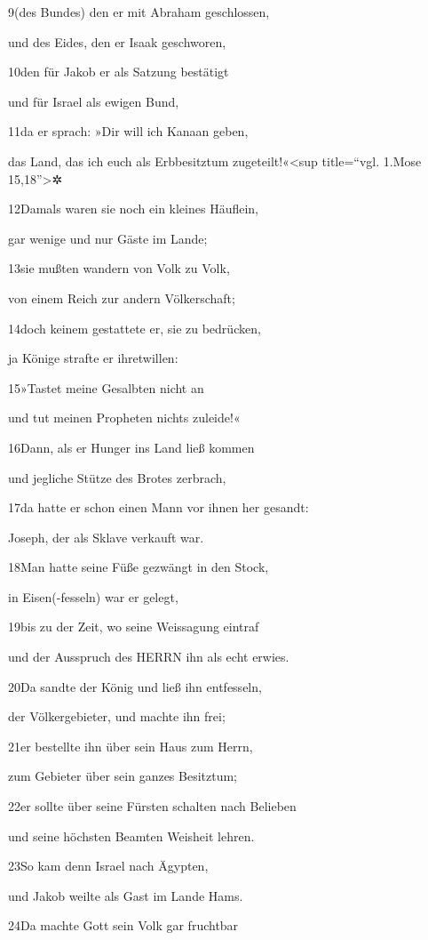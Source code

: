 9(des Bundes) den er mit Abraham geschlossen,

und des Eides, den er Isaak geschworen,

10den für Jakob er als Satzung bestätigt

und für Israel als ewigen Bund,

11da er sprach: »Dir will ich Kanaan geben,

das Land, das ich euch als Erbbesitztum zugeteilt!«\textless sup
title=``vgl. 1.Mose 15,18''\textgreater✲

12Damals waren sie noch ein kleines Häuflein,

gar wenige und nur Gäste im Lande;

13sie mußten wandern von Volk zu Volk,

von einem Reich zur andern Völkerschaft;

14doch keinem gestattete er, sie zu bedrücken,

ja Könige strafte er ihretwillen:

15»Tastet meine Gesalbten nicht an

und tut meinen Propheten nichts zuleide!«

16Dann, als er Hunger ins Land ließ kommen

und jegliche Stütze des Brotes zerbrach,

17da hatte er schon einen Mann vor ihnen her gesandt:

Joseph, der als Sklave verkauft war.

18Man hatte seine Füße gezwängt in den Stock,

in Eisen(-fesseln) war er gelegt,

19bis zu der Zeit, wo seine Weissagung eintraf

und der Ausspruch des HERRN ihn als echt erwies.

20Da sandte der König und ließ ihn entfesseln,

der Völkergebieter, und machte ihn frei;

21er bestellte ihn über sein Haus zum Herrn,

zum Gebieter über sein ganzes Besitztum;

22er sollte über seine Fürsten schalten nach Belieben

und seine höchsten Beamten Weisheit lehren.

23So kam denn Israel nach Ägypten,

und Jakob weilte als Gast im Lande Hams.

24Da machte Gott sein Volk gar fruchtbar

